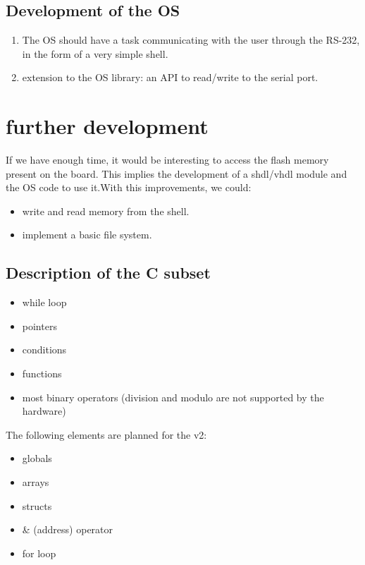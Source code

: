 \documentclass{article}
\begin{document}
      \subsection{Development of the OS}
        \begin{enumerate}
          \item The OS should have a task communicating with the user through
            the RS-232, in the form of a very simple shell.
          \item extension to the OS library: an API to read/write to the serial 
              port.
        \end{enumerate}

      \section{further development}
        If we have enough time, it would be interesting to access the flash
        memory present on the board. This implies the development of a shdl/vhdl
        module and the OS code to use it.With this improvements, we could:
        \begin{itemize}
          \item write and read memory from the shell.
          \item implement a basic file system.
        \end{itemize}

\newpage
  \begin{appendix}
    \section{Description of the C subset}
      \begin{itemize}
        \item while loop
        \item pointers
        \item conditions
        \item functions
        \item most binary operators (division and modulo are not supported by the
          hardware)
      \end{itemize}
      The following elements are planned for the v2:
      \begin{itemize}
        \item globals
        \item arrays
        \item structs
        \item \& (address) operator
        \item for loop
      \end{itemize}
  \end{appendix}
\end{document}

